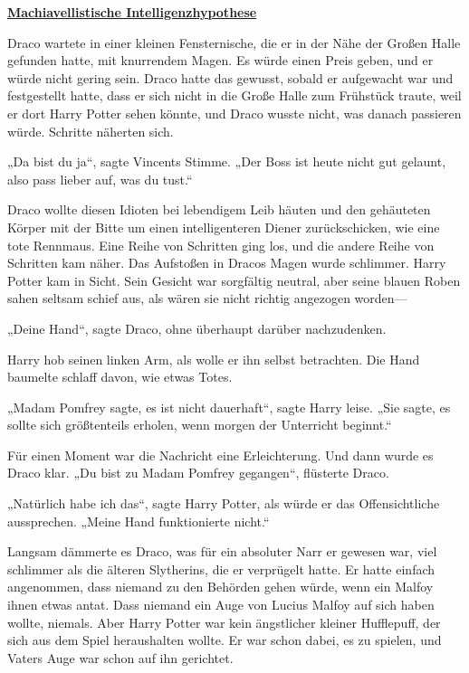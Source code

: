 

\hypertarget{machiavellistische-intelligenzhypothese}{%

\textbf{\uline{Machiavellistische Intelligenzhypothese}}

Draco wartete in einer kleinen Fensternische, die er in der Nähe der Großen Halle gefunden hatte, mit knurrendem Magen. Es würde einen Preis geben, und er würde nicht gering sein. Draco hatte das gewusst, sobald er aufgewacht war und festgestellt hatte, dass er sich nicht in die Große Halle zum Frühstück traute, weil er dort Harry Potter sehen könnte, und Draco wusste nicht, was danach passieren würde. Schritte näherten sich.

„Da bist du ja“, sagte Vincents Stimme. „Der Boss ist heute nicht gut gelaunt, also pass lieber auf, was du tust.“

Draco wollte diesen Idioten bei lebendigem Leib häuten und den gehäuteten Körper mit der Bitte um einen intelligenteren Diener zurückschicken, wie eine tote Rennmaus. Eine Reihe von Schritten ging los, und die andere Reihe von Schritten kam näher. Das Aufstoßen in Dracos Magen wurde schlimmer. Harry Potter kam in Sicht. Sein Gesicht war sorgfältig neutral, aber seine blauen Roben sahen seltsam schief aus, als wären sie nicht richtig angezogen worden—

„Deine Hand“, sagte Draco, ohne überhaupt darüber nachzudenken.

Harry hob seinen linken Arm, als wolle er ihn selbst betrachten. Die Hand baumelte schlaff davon, wie etwas Totes.

„Madam Pomfrey sagte, es ist nicht dauerhaft“, sagte Harry leise. „Sie sagte, es sollte sich größtenteils erholen, wenn morgen der Unterricht beginnt.“

Für einen Moment war die Nachricht eine Erleichterung. Und dann wurde es Draco klar. „Du bist zu Madam Pomfrey gegangen“, flüsterte Draco.

„Natürlich habe ich das“, sagte Harry Potter, als würde er das Offensichtliche aussprechen. „Meine Hand funktionierte nicht.“

Langsam dämmerte es Draco, was für ein absoluter Narr er gewesen war, viel schlimmer als die älteren Slytherins, die er verprügelt hatte. Er hatte einfach angenommen, dass niemand zu den Behörden gehen würde, wenn ein Malfoy ihnen etwas antat. Dass niemand ein Auge von Lucius Malfoy auf sich haben wollte, niemals. Aber Harry Potter war kein ängstlicher kleiner Hufflepuff, der sich aus dem Spiel heraushalten wollte. Er war schon dabei, es zu spielen, und Vaters Auge war schon auf ihn gerichtet.

}
